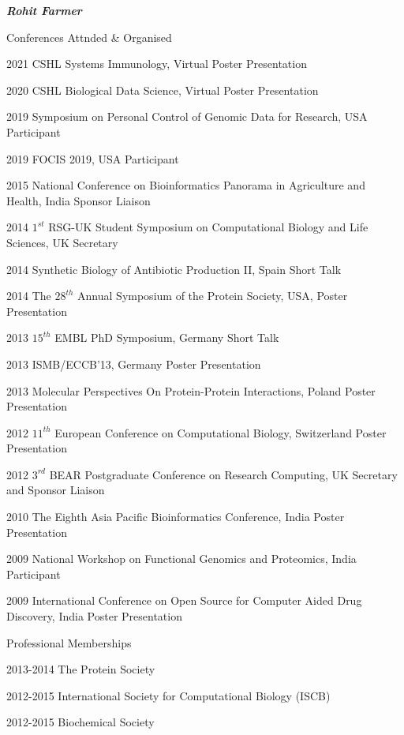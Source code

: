 \documentclass[10pt]{article}
\begin{document}
\begin{cv}{\huge \it \bfseries Rohit Farmer}
\vskip3pt
\begin{cvlist}{Conferences Attnded \& Organised}
        \item[2021] CSHL Systems Immunology, Virtual \hfill Poster Presentation 
        \item[2020] CSHL Biological Data Science, Virtual \hfill Poster Presentation 
        \item[2019] Symposium on Personal Control of Genomic Data for Research, USA \hfill Participant 
        \item[2019] FOCIS 2019, USA \hfill Participant
        \item[2015] National Conference on Bioinformatics Panorama in Agriculture and Health, India \hfill Sponsor Liaison
	\item[2014] $1^{st}$ RSG-UK Student Symposium on Computational Biology and Life Sciences, UK \hfill Secretary
	\item[2014] Synthetic Biology of Antibiotic Production II, Spain \hfill Short Talk
	\item[2014] The $28^{th}$ Annual Symposium of the Protein Society, USA, \hfill Poster Presentation
	\item[2013] $15^{th}$ EMBL PhD Symposium, Germany \hfill Short Talk
	\item[2013] ISMB/ECCB'13, Germany \hfill Poster Presentation
	\item[2013] Molecular Perspectives On Protein-Protein Interactions, Poland \hfill Poster Presentation
	\item[2012] $11^{th}$ European Conference on Computational Biology, Switzerland \hfill Poster Presentation
	\item[2012] $3^{rd}$ BEAR Postgraduate Conference on Research Computing, UK \hfill Secretary and Sponsor Liaison
	\item[2010] The Eighth Asia Pacific Bioinformatics Conference, India \hfill Poster Presentation
	\item[2009] National Workshop on Functional Genomics and Proteomics, India \hfill Participant
	\item[2009] International Conference on Open Source for Computer Aided Drug Discovery, India \hfill Poster Presentation
\end{cvlist}

\vskip3pt
\begin{cvlist}{Professional Memberships}
	\item[2013-2014] The Protein Society
	\item[2012-2015] International Society for Computational Biology (ISCB)
	\item[2012-2015] Biochemical Society
\end{cvlist}


\end{cv}
\end{document}
